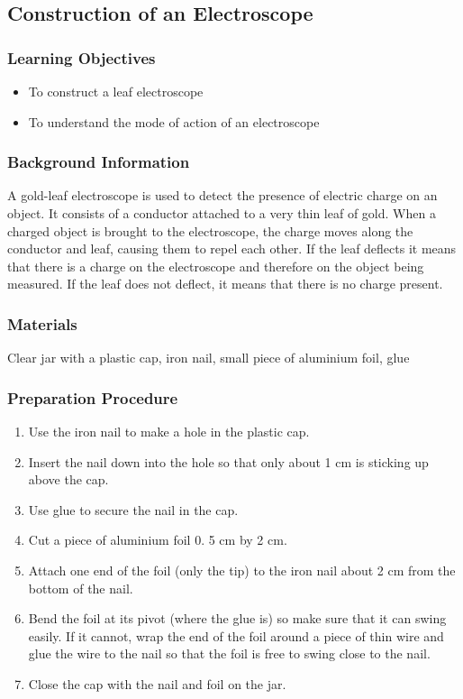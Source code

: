 \subsection{Construction of an Electroscope}

\subsubsection*{Learning Objectives}
\begin{itemize}
\item{To construct a leaf electroscope} 
\item{To understand the mode of action of an electroscope} 
\end{itemize}

\subsubsection*{Background Information}
A gold-leaf electroscope is used to detect the presence of electric charge on an object. It consists of a conductor attached to a very thin leaf of gold. When a charged object is brought to the electroscope, the charge moves along the conductor and leaf, causing them to repel each other. If the leaf deflects it means that there is a charge on the electroscope and therefore on the object being measured. If the leaf does not deflect, it means that there is no charge present.  

\subsubsection*{Materials}
Clear jar with a plastic cap, iron nail, small piece of aluminium foil, glue


\subsubsection*{Preparation Procedure}
\begin{enumerate}
\item{Use the iron nail to make a hole in the plastic cap.} 
\item{Insert the nail down into the hole so that only about 1 cm is sticking up above the cap.} 
\item{Use glue to secure the nail in the cap.} 
\item{Cut a piece of aluminium foil 0.  5 cm by 2 cm.} 
\item{Attach one end of the foil (only the tip) to the iron nail about 2 cm from the bottom of the nail.} 
\item{Bend the foil at its pivot (where the glue is) so make sure that it can swing easily. If it cannot, wrap the end of the foil around a piece of thin wire and glue the wire to the nail so that the foil is free to swing close to the nail.} 
\item{Close the cap with the nail and foil on the jar.} 
\end{enumerate}

